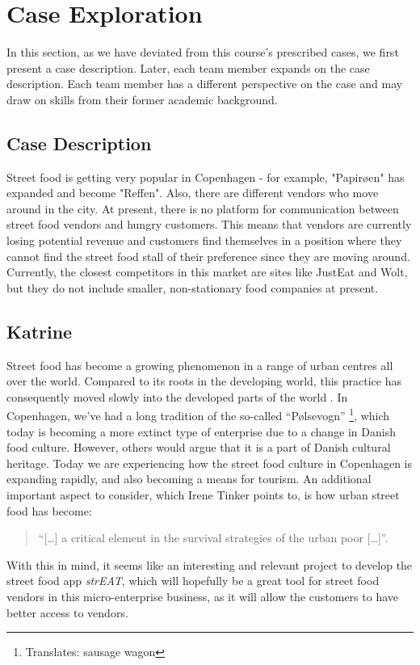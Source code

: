 \section{Case Exploration}
In this section, as we have deviated from this course's prescribed cases, we first present a case description. Later, each team member expands on the case description. Each team member has a different perspective on the case and may draw on skills from their former academic background.

\subsection{Case Description}
Street food is getting very popular in Copenhagen - for example, "Papirøen" has expanded and become "Reffen". Also, there are different vendors who move around in the city. At present, there is no platform for communication between street food vendors and hungry customers. This means that vendors are currently losing potential revenue and customers find themselves in a position where they cannot find the street food stall of their preference since they are moving around. Currently, the closest competitors in this market are sites like JustEat and Wolt, but they do not include smaller, non-stationary food companies at present.

\subsection{Katrine}
Street food has become a growing phenomenon in a range of urban centres all over the world. Compared to its roots in the developing world, this practice has consequently moved slowly into the developed parts of the world \cite{Tinker}. In Copenhagen, we’ve had a long tradition of the so-called “Pølsevogn” \footnote{Translates: sausage wagon}, which today is becoming a more extinct type of enterprise due to a change in Danish food culture.  However, others would argue that it is a part of Danish cultural heritage. Today we are experiencing how the street food culture in Copenhagen is expanding rapidly, and also becoming a means for tourism. An additional important aspect to consider, which Irene Tinker \cite{Tinker} points to, is how urban street food has become:
\begin{quotation}
“[…] a critical element in the survival strategies of the urban poor […]”.
\end{quotation}
With this in mind, it seems like an interesting and relevant project to develop the street food app \textit{strEAT}, which will hopefully be a great tool for street food vendors in this micro-enterprise business, as it will allow the customers to have better access to vendors.

